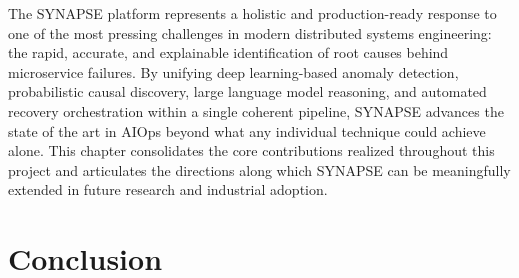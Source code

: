 
\hspace*{0.3in} The SYNAPSE platform represents a holistic and production-ready response to one of the most pressing challenges in modern distributed systems engineering: the rapid, accurate, and explainable identification of root causes behind microservice failures. By unifying deep learning-based anomaly detection, probabilistic causal discovery, large language model reasoning, and automated recovery orchestration within a single coherent pipeline, SYNAPSE advances the state of the art in AIOps beyond what any individual technique could achieve alone. This chapter consolidates the core contributions realized throughout this project and articulates the directions along which SYNAPSE can be meaningfully extended in future research and industrial adoption.\\

\section{Conclusion}
\vspace{0.2cm}

